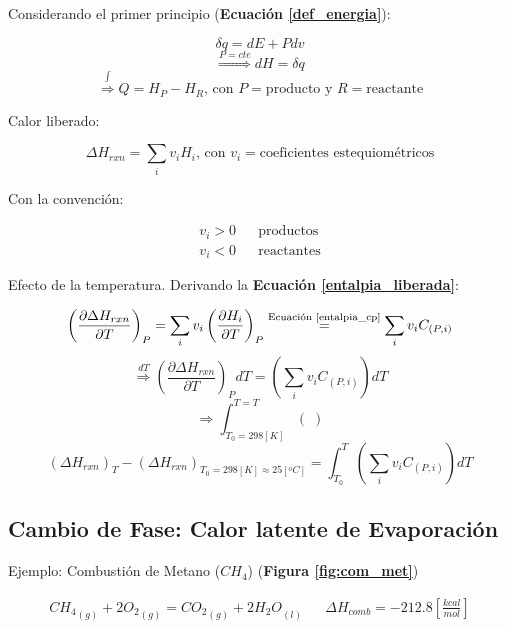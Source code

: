     Considerando el primer principio (\textbf{Ecuación \ref{def_energia}}):
    
    \[\delta q = dE + Pdv\]
    \[\overset{P=cte}{\Rightarrow} dH=\delta q\]
    \[\overset{\int}{\Rightarrow} Q = H_{P} - H_{R} \text{, con }P= \text{producto y }R= \text{reactante}\]
    
    Calor liberado:
    
    \begin{equation}
    \label{entalpia_liberada}
        \Delta H_{rxn} = \sum_{i} v_{i}H_{i} \text{, con }v_{i}= \text{coeficientes estequiométricos}
    \end{equation}
    
    Con la convención:
    
    \[\begin{matrix}
        v_{i} > 0 &  & \text{productos}\\ 
        v_{i} < 0 &  & \text{reactantes}
    \end{matrix}\]
    
    Efecto de la temperatura. Derivando la \textbf{Ecuación \ref{entalpia_liberada}}:
    
    \[\left ( \frac{\partial \Delta H_{rxn}}{\partial T} \right )_{P} = \sum_{i}v_{i} \left ( \frac{\partial H_{i}}{\partial T} \right )_{P} \overset{\text{Ecuación \ref{entalpia_cp}}}{=} \sum_{i}v_{i}C_{(P, i)}\]
    \[\overset{dT}{\Rightarrow} \left ( \frac{\partial \Delta H_{rxn}}{\partial T} \right )_{P} dT = \left ( \sum_{i}v_{i}C_{(P, i)} \right ) dT\]
    \[\Rightarrow \int_{T_{0}=298[K]}^{T=T} (\;)\]
    \begin{equation}
    \label{entalpia_temp}
        \left ( \Delta H_{rxn}\right )_{T} - \left ( \Delta H_{rxn} \right )_{T_{0}=298[K]\approx 25[{}^{o}C]} = \int_{T_{0}}^{T} \left ( \sum_{i} v_{i} C_{(P, i)} \right ) dT
    \end{equation}
    
    \subsection{Cambio de Fase: Calor latente de Evaporación}
    
    Ejemplo: Combustión de Metano (\(CH_{4}\)) (\textbf{Figura \ref{fig:com_met}})
    
    \[\begin{matrix}
        {CH_{4}}_{(g)} + 2{O_{2}}_{(g)} = {CO_{2}}_{(g)} + 2{H_{2}O}_{(l)} &  & \Delta H_{comb}=-212.8 \left [ \frac{kcal}{mol} \right ]
    \end{matrix}\]
    
